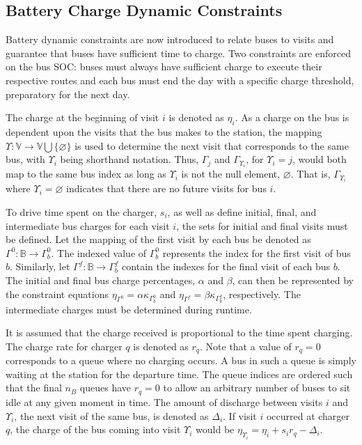 \documentclass[utf8]{FrontiersinHarvard}
\begin{document}
\subsection{Battery Charge Dynamic Constraints}
\label{sec:batt_dynamics}
Battery dynamic constraints are now introduced to relate buses to visits and guarantee that buses have sufficient time
to charge. Two constraints are enforced on the bus SOC: buses must always have sufficient charge to execute their
respective routes and each bus must end the day with a specific charge threshold, preparatory for the next day.

The charge at the beginning of visit \(i\) is denoted as \(\eta_i\). As a charge on the bus is dependent upon the visits that
the bus makes to the station, the mapping \(\Upsilon: \mathbb{V} \rightarrow \mathbb{V} \bigcup \{\varnothing\}\) is used to determine the next
visit that corresponds to the same bus, with \(\Upsilon_i\) being shorthand notation. Thus, \(\Gamma_j\) and \(\Gamma_{\Upsilon_i}\), for \(\Upsilon_i = j\),
would both map to the same bus index as long as \(\Upsilon_i\) is not the null element, \(\varnothing\). That is, \(\Gamma_{\Upsilon_i}\) where
\(\Upsilon_i = \varnothing\) indicates that there are no future visits for bus \(i\).

To drive time spent on the charger, \(s_i\), as well as define initial, final, and intermediate bus charges for each visit
\(i\), the sets for initial and final visits must be defined. Let the mapping of the first visit by each bus be denoted as
\(\Gamma^0 : \mathbb{B} \rightarrow \Gamma^0_b\). The indexed value of \(\Gamma^0_b\) represents the index for the first visit of bus \(b\). Similarly,
let \(\Gamma^f : \mathbb{B} \rightarrow \Gamma_b^f\) contain the indexes for the final visit of each bus \(b\). The initial and final bus charge
percentages, \(\alpha\) and \(\beta\), can then be represented by the constraint equations \(\eta_{\Gamma^0} = \alpha \kappa_{\Gamma^0_b}\) and \(\eta_{\Gamma^f} = \beta
\kappa_{\Gamma^f_b}\), respectively. The intermediate charges must be determined during runtime.

It is assumed that the charge received is proportional to the time spent charging. The charge rate for charger \(q\) is
denoted as \(r_q\). Note that a value of \(r_q = 0\) corresponds to a queue where no charging occurs. A bus in such a queue
is simply waiting at the station for the departure time. The queue indices are ordered such that the final \(n_B\) queues
have \(r_q = 0\) to allow an arbitrary number of buses to sit idle at any given moment in time. The amount of discharge
between visits \(i\) and \(\Upsilon_i\), the next visit of the same bus, is denoted as \(\Delta_i\). If visit \(i\) occurred at charger \(q\),
the charge of the bus coming into visit \(\Upsilon_i\) would be \(\eta_{\Upsilon_i} = \eta_i + s_i r_q - \Delta_i\).
\end{document}
